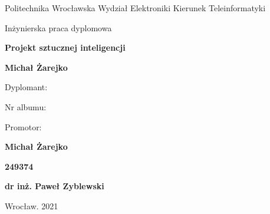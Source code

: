 \documentclass[12pt,oneside,a4paper]{report}
\begin{document}
\begin{titlepage}
   \begin{center}
        \vspace*{2cm}

        \large Politechnika Wrocławska Wydział Elektroniki Kierunek Teleinformatyki
        \vspace*{2cm}

        \large Inżynierska praca dyplomowa

        \vspace*{0.5cm}
        \huge\textbf{Projekt sztucznej inteligencji}

        \vspace{0.5cm}
        \normalsize 
            
        \textbf{Michał Żarejko}
        \vspace{3cm}

   \end{center}

        \setlength{\columnsep}{-20pt}
        \begin{multicols}{2}
           Dyplomant:  

           \vspace{0.2cm}
           Nr albumu:

           \vspace{0.2cm}
           Promotor:

        \columnbreak
           \textbf{Michał Żarejko}

           \vspace{0.2cm}
            \textbf{249374}

           \vspace{0.2cm}
            \textbf{dr inż. Paweł Zyblewski}
        \end{multicols}

        \vspace{0.5cm}


        \vspace{2cm}
   \begin{center}
        Wrocław. 2021


   \end{center}
\end{titlepage}


\tableofcontents{}
\newpage

\setlength{\parindent}{0.5em}
\setlength{\parskip}{0.5em}
\renewcommand{\baselinestretch}{2.0}
\end{document}
